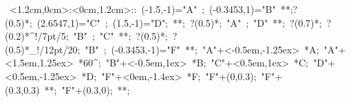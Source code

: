 

\hbox{
\xy    <1.2cm,0cm>:<0cm,1.2cm>::
       (-1.5,-1)="A" ; (-0.3453,1)="B" **\dir{-};?(0.5)*\dir{>>};  
       (2.6547,1)="C" ; (1.5,-1)="D"; **\dir{-}; ?(0.5)*\dir{>>};
       "A" ; "D" **\dir{-}; ?(0.7)*\dir{>};  ?(0.2)*^!/7pt/{5};
       "B" ; "C" **\dir{-}; ?(0.5)*\dir{>};  ?(0.5)*_!/12pt/{20};
       "B" ; (-0.3453,-1)="F" **\dir{-};   
       "A"+<-0.5em,-1.25ex> *{A}; 
       "A"+<1.5em,1.25ex> *{60^\circ}; 
       "B"+<-0.5em,1ex> *{B}; 
       "C"+<0.5em,1ex> *{C}; 
       "D"+<0.5em,-1.25ex> *{D}; 
       "F"+<0em,-1.4ex> *{F}; 
       "F"+(0,0.3); "F"+(0.3,0.3) **\dir{-}; 
       "F"+(0.3,0); **\dir{-}; 
\endxy}
